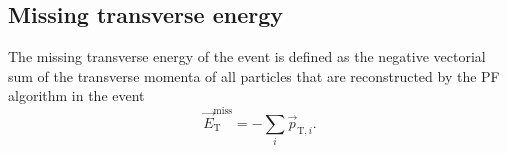 \subsection{Missing transverse energy}\label{sec:MET}
The missing transverse energy of the event is defined as the negative vectorial sum of the transverse momenta 
of all particles that are reconstructed by the PF algorithm in the event\,\cite{CMS_MET}
\begin{equation}
    \vec{E}_{\text{T}}^\text{miss} = -\sum_i \vec{p}_{\text{T},i}.
\end{equation}
